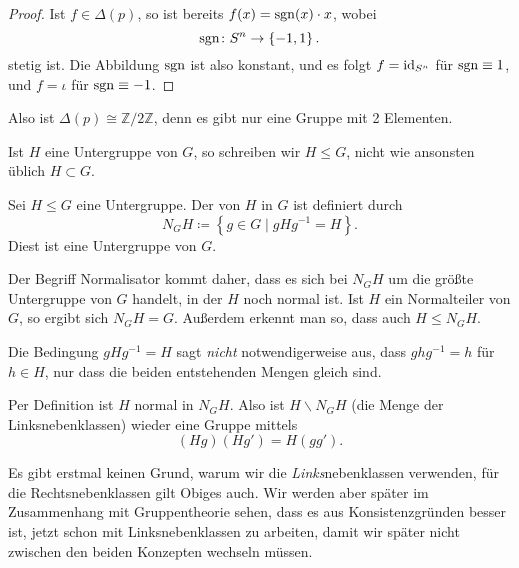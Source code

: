 \begin{example}
\begin{enumerate}[1)]
\begin{proof}
                Ist $f\in \Delta(p)$, so ist bereits $f(x) = \operatorname{sgn}(x) \cdot x$, wobei
                \[
                \operatorname{sgn} \colon  S^n \to  \left \{-1,1\right\} 
                .\] 
                stetig ist. Die Abbildung $\operatorname{sgn}$ ist also konstant, und es folgt  $f=\operatorname{id}_{S^n}$ für $\operatorname{sgn} \equiv 1$, und $f = ι$ für  $\operatorname{sgn} \equiv -1$.
            \end{proof}

            Also ist $\Delta(p) \cong \mathbb{Z} / 2\mathbb{Z}$, denn es gibt nur eine Gruppe mit 2 Elementen.
    \end{enumerate}
\end{example}

\begin{notation*}
    Ist $H$ eine Untergruppe von  $G$, so schreiben wir  $H \leq G$, nicht wie ansonsten üblich $H \subset G$.
\end{notation*}

\begin{definition}[Normalisator]\label{def:normalisator}
    Sei $H\leq  G$ eine Untergruppe. Der  von $H$ in  $G$ ist definiert durch
    \[
    N_GH \coloneqq  \left \{g\in G \mid  gH g^{-1} = H\right\} 
    .\] 
    Diest ist eine Untergruppe von $G$.
\end{definition}

\begin{remark*}
    Der Begriff Normalisator kommt daher, dass es sich bei $N_GH$ um die größte Untergruppe von  $G$ handelt, in der  $H$ noch normal ist. Ist  $H$ ein Normalteiler von  $G$, so ergibt sich  $N_GH = G$. Außerdem erkennt man so, dass auch  $H \leq  N_GH$.
\end{remark*}

\begin{remark}
    Die Bedingung $gH g^{-1} = H$ sagt \textit{nicht} notwendigerweise aus, dass $ghg^{-1} = h$ für $h\in H$, nur dass die beiden entstehenden Mengen gleich sind.    
\end{remark}

\begin{remark}
    Per Definition ist $H$ normal in  $N_GH$. Also ist $H \backslash N_GH$ (die Menge der Linksnebenklassen) wieder eine Gruppe mittels
    \[
        (Hg) (Hg') = H(gg')
    .\] 
\end{remark}

\begin{oral}
    Es gibt erstmal keinen Grund, warum wir die \textit{Links}nebenklassen verwenden, für die Rechtsnebenklassen gilt Obiges auch. Wir werden aber später im Zusammenhang mit Gruppentheorie sehen, dass es aus Konsistenzgründen besser ist, jetzt schon mit Linksnebenklassen zu arbeiten, damit wir später nicht zwischen den beiden Konzepten wechseln müssen.
\end{oral}

